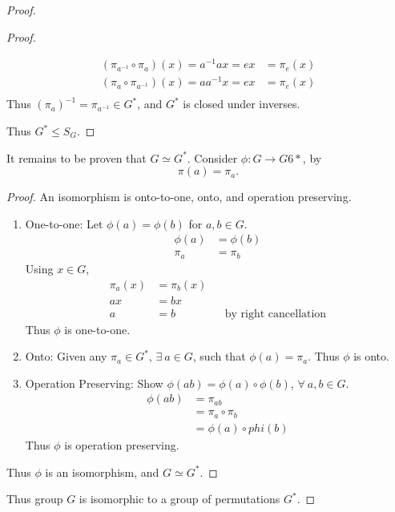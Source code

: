\begin{proof}
\begin{proof}
\begin{enumerate}
\begin{align*}
                (\pi_{a^{-1}} \circ \pi_a)(x) = a^{-1}ax = ex & = \pi_e(x) \\
                (\pi_a \circ \pi_{a^{-1}})(x) = aa^{-1}x = ex & = \pi_e(x) \\
            \end{align*}
            Thus $(\pi_a)^{-1} = \pi_{a^{-1}} \in G^*$, and $G^*$ is closed under inverses.
        \end{enumerate}
        Thus $G^* \leq S_G$.
    \end{proof}
    It remains to be proven that $G \simeq G^*$. Consider $\phi: G \rightarrow G6*$, by
    \[
        \pi(a) = \pi_a.
    \]
    \begin{proof}
        An isomorphism is onto-to-one, onto, and operation preserving.
        \begin{enumerate}
            \item One-to-one: Let $\phi(a) = \phi(b)$ for $a,b \in G$.
            \begin{align*}
                \phi(a) & = \phi(b) \\
                \pi_a & = \pi_b
            \end{align*}
            Using $x \in G$,
            \begin{align*}
                \pi_a(x) & = \pi_b(x) \\
                ax & = bx \\
                a & = b && \text{by right cancellation}
            \end{align*}
            Thus $\phi$ is one-to-one.
            \item Onto: Given any $\pi_a \in G^*$, $\exists~a \in G$, such that $\phi(a) = \pi_a$. Thus $\phi$ is onto.
            \item Operation Preserving: Show $\phi(ab) = \phi(a) \circ \phi(b)$, $\forall~a,b \in G$.
            \begin{align*}
                \phi(ab) & = \pi_{ab} \\
                & = \pi_a \circ \pi_b \\
                & = \phi(a) \circ phi(b)
            \end{align*}
            Thus $\phi$ is operation preserving.
        \end{enumerate}
        Thus $\phi$ is an isomorphism, and $G \simeq G^*$.
    \end{proof}
    Thus group $G$ is isomorphic to a group of permutations $G^*$.
\end{proof}